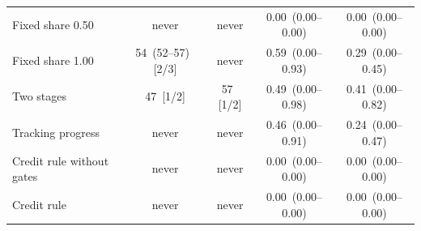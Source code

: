 \begin{tabular}{@{}lcccc@{}}
Fixed share 0.50 & never & never & 0.00 \,{\scriptsize(0.00--0.00)} & 0.00 \,{\scriptsize(0.00--0.00)} \\
Fixed share 1.00 & 54 \,{\scriptsize(52--57)} \,{\scriptsize[2/3]} & never & 0.59 \,{\scriptsize(0.00--0.93)} & 0.29 \,{\scriptsize(0.00--0.45)} \\
Two stages~\cite{hil} & 47 \,{\scriptsize[1/2]} & 57 \,{\scriptsize[1/2]} & 0.49 \,{\scriptsize(0.00--0.98)} & 0.41 \,{\scriptsize(0.00--0.82)} \\
Tracking progress~\cite{wang2026generalizing} & never & never & 0.46 \,{\scriptsize(0.00--0.91)} & 0.24 \,{\scriptsize(0.00--0.47)} \\
Credit rule without gates & never & never & 0.00 \,{\scriptsize(0.00--0.00)} & 0.00 \,{\scriptsize(0.00--0.00)} \\
Credit rule & never & never & 0.00 \,{\scriptsize(0.00--0.00)} & 0.00 \,{\scriptsize(0.00--0.00)} \\
\bottomrule
\end{tabular}
